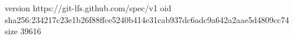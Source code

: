 version https://git-lfs.github.com/spec/v1
oid sha256:234217c23e1b26f88ffce5240b414e31cab937dc6adc9a642a2aae5d4809cc74
size 39616
